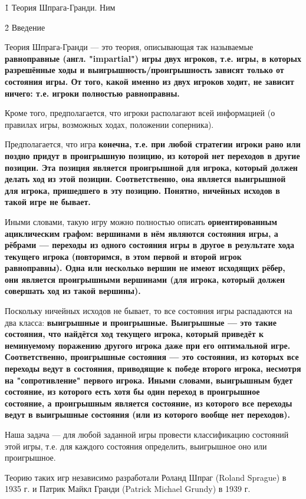 \h1{ Теория Шпрага-Гранди. Ним }


\h2{ Введение }

Теория Шпрага-Гранди --- это теория, описывающая так называемые \bf{равноправные} (англ. "impartial") игры двух игроков, т.е. игры, в которых разрешённые ходы и выигрышность/проигрышность зависят только от состояния игры. От того, какой именно из двух игроков ходит, не зависит ничего: т.е. игроки полностью равноправны.

Кроме того, предполагается, что игроки располагают всей информацией (о правилах игры, возможных ходах, положении соперника).

Предполагается, что игра \bf{конечна}, т.е. при любой стратегии игроки рано или поздно придут в \bf{проигрышную} позицию, из которой нет переходов в другие позиции. Эта позиция является проигрышной для игрока, который должен делать ход из этой позиции. Соответственно, она является выигрышной для игрока, пришедшего в эту позицию. Понятно, ничейных исходов в такой игре не бывает.

Иными словами, такую игру можно полностью описать \bf{ориентированным ациклическим графом}: вершинами в нём являются состояния игры, а рёбрами --- переходы из одного состояния игры в другое в результате хода текущего игрока (повторимся, в этом первой и второй игрок равноправны). Одна или несколько вершин не имеют исходящих рёбер, они является проигрышными вершинами (для игрока, который должен совершать ход из такой вершины).

Поскольку ничейных исходов не бывает, то все состояния игры распадаются на два класса: \bf{выигрышные и проигрышные}. Выигрышные --- это такие состояния, что найдётся ход текущего игрока, который приведёт к неминуемому поражению другого игрока даже при его оптимальной игре. Соответственно, проигрышные состояния --- это состояния, из которых все переходы ведут в состояния, приводящие к победе второго игрока, несмотря на "сопротивление" первого игрока. Иными словами, выигрышным будет состояние, из которого есть хотя бы один переход в проигрышное состояние, а проигрышным является состояние, из которого все переходы ведут в выигрышные состояния (или из которого вообще нет переходов).

Наша задача --- для любой заданной игры провести классификацию состояний этой игры, т.е. для каждого состояния определить, выигрышное оно или проигрышное.

Теорию таких игр независимо разработали Роланд Шпраг (Roland Sprague) в 1935 г. и Патрик Майкл Гранди (Patrick Michael Grundy) в 1939 г.


